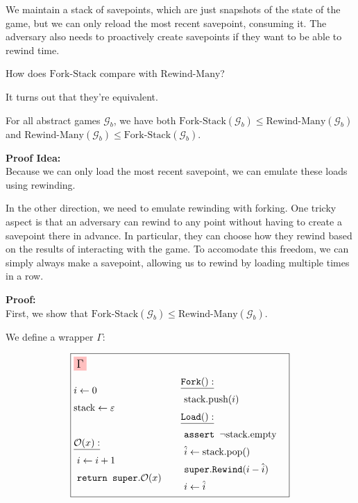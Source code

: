 We maintain a stack of savepoints, which are just snapshots of the state
of the game, but we can only reload the most recent savepoint, consuming
it.
The adversary also needs to proactively create savepoints if they want to be able
to rewind time.

How does $\text{Fork-Stack}$ compare with $\text{Rewind-Many}$?

It turns out that they're equivalent.

\begin{claim}
    \label{claim:fork-stack-is-not-stronger}
    For all abstract games $\mathcal{G}_b$, we have both
    $\text{Fork-Stack}(\mathcal{G}_b) \leq \text{Rewind-Many}(\mathcal{G}_b)$
    and $\text{Rewind-Many}(\mathcal{G}_b) \leq \text{Fork-Stack}(\mathcal{G}_b)$.
\end{claim}

\textbf{Proof Idea:}\\
Because we can only load the most recent savepoint, we can emulate
these loads using rewinding.

In the other direction, we need to emulate rewinding with forking.
One tricky aspect is that an adversary can rewind to any point without
having to create a savepoint there in advance.
In particular, they can choose how they rewind based on the results
of interacting with the game.
To accomodate this freedom, we can simply always make a savepoint,
allowing us to rewind by loading multiple times in a row.

\textbf{Proof:}\\
First, we show that $\text{Fork-Stack}(\mathcal{G}_b) \leq \text{Rewind-Many}(\mathcal{G}_b)$.

We define a wrapper $\Gamma$:

$$
\boxed{
\begin{aligned}
&\colorbox{pink}{\large $\Gamma$}\cr
&\begin{aligned}
    &i \gets 0\cr
    &\text{stack} \gets \varepsilon\cr
    &\cr
    &\underline{\mathcal{O}(x):}\cr
    &\ i \gets i + 1\cr
    &\ \texttt{return } \texttt{super}.\mathcal{O}(x)\cr
\end{aligned}
&\begin{aligned}
    &\underline{\texttt{Fork}():}\cr
    &\ \text{stack}.\text{push}(i)\cr
    &\underline{\texttt{Load}():}\cr
    &\ \texttt{assert } \neg \text{stack}.\text{empty}\cr
    &\ \hat{i} \gets \text{stack}.\text{pop}()\cr
    &\ \texttt{super}.\texttt{Rewind}(i - \hat{i})\cr
    &\ i \gets \hat{i}\cr
\end{aligned}\cr
\end{aligned}
}
$$

